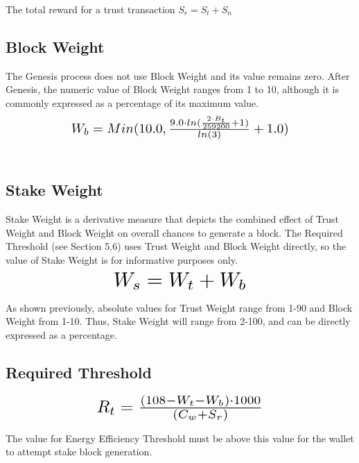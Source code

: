 \documentclass[11pt]{article}
\begin{document}
\noindent The total reward for a trust transaction $S_{r} = S_{t} + S_{n}$\\


\subsection{Block Weight}
The Genesis process does not use Block Weight and its value remains zero. After Genesis, the numeric value of Block Weight ranges from 1 to 10, although it is commonly expressed as a percentage of its maximum value.\\

\begin{equation}
\resizebox{.65\hsize}{!}{$W_{b} = Min(10.0, \frac{9.0 \cdot ln(\frac{2 \cdot B_{t}}{259200} + 1)}{ln(3)} + 1.0)$}
\end{equation}\\


\subsection{Stake Weight}
Stake Weight is a derivative measure that depicts the combined effect of Trust Weight and Block Weight on overall chances to generate a block. The Required Threshold (see Section 5.6) uses Trust Weight and Block Weight directly, so the value of Stake Weight is for informative purposes only.\\

\begin{equation}
\resizebox{.40\hsize}{!}{$W_{s} = W_{t} + W_{b}$}
\end{equation}

\noindent As shown previously, absolute values for Trust Weight range from 1-90 and Block Weight from 1-10. Thus, Stake Weight will range from 2-100, and can be directly expressed as a percentage.\\


\subsection{Required Threshold}

\begin{equation}
\resizebox{.5\hsize}{!}{$R_{t} = \frac{(108 - W_{t} - W_{b}) \cdot 1000}{(C_{w} + S_{r})}$}
\end{equation}


\noindent The value for Energy Efficiency Threshold must be above this value for the wallet to attempt stake block generation.\\
\end{document}
